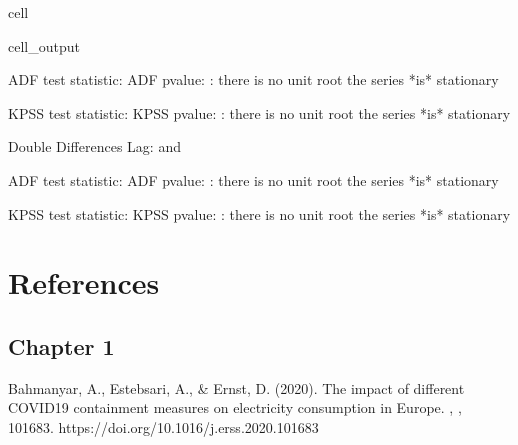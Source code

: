\documentclass[letterpaper,10pt,english]{jupyterBook}
\begin{document}
\begin{sphinxuseclass}{cell}
\begin{sphinxuseclass}{cell_output}
\begin{sphinxVerbatim}[commandchars=\\\{\}]
ADF test statistic:  ADF p\PYGZhy{}value: \PYGZpc{}:
there is no unit root \PYGZhy{} the series *is* stationary

KPSS test statistic:  KPSS p\PYGZhy{}value: \PYGZpc{}:
there is no unit root \PYGZhy{} the series *is* stationary
\end{sphinxVerbatim}

\begin{sphinxVerbatim}[commandchars=\\\{\}]
Double Differences Lag:  and 
\end{sphinxVerbatim}

\begin{sphinxVerbatim}[commandchars=\\\{\}]
ADF test statistic:  ADF p\PYGZhy{}value: \PYGZpc{}:
there is no unit root \PYGZhy{} the series *is* stationary

KPSS test statistic:  KPSS p\PYGZhy{}value: \PYGZpc{}:
there is no unit root \PYGZhy{} the series *is* stationary
\end{sphinxVerbatim}

\end{sphinxuseclass}
\end{sphinxuseclass}

\chapter{References}
\label{\detokenize{references:references}}\label{\detokenize{references::doc}}

\section{Chapter 1}
\label{\detokenize{references:chapter-1}}
\sphinxAtStartPar
Bahmanyar, A., Estebsari, A., \& Ernst, D. (2020). The impact of different COVID\sphinxhyphen{}19 containment measures on electricity consumption in Europe. , , 101683. https://doi.org/10.1016/j.erss.2020.101683
\end{document}
